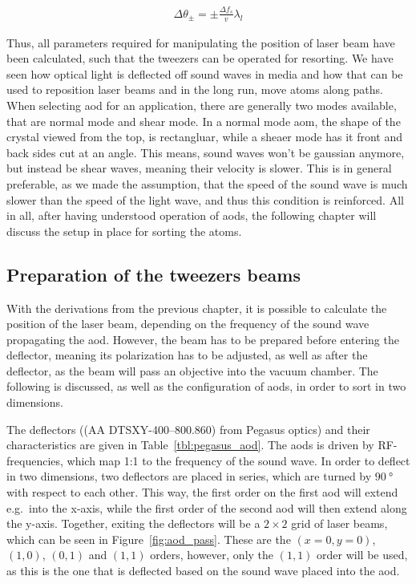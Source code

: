 \begin{align}
	\Delta\theta_\pm = \pm \frac {\Delta f_s}{v} \lambda_l
\end{align}
\label{eq:aod_angle}

Thus, all parameters required for manipulating the position of laser beam have been calculated, such that the tweezers can be operated for resorting. We have seen how optical light is deflected off sound waves in media and how that can be used to reposition laser beams and in the long run, move atoms along paths. When selecting \ac{aod} for an application, there are generally two modes available, that are normal mode and shear mode. In a normal mode \ac{aom}, the shape of the crystal viewed from the top, is rectangluar, while a sheaer mode has it front and back sides cut at an angle. This means, sound waves won't be gaussian anymore, but instead be shear waves, meaning their velocity is slower. This is in general preferable, as we made the assumption, that the speed of the sound wave is much slower than the speed of the light wave, and thus this condition is reinforced. All in all, after having understood operation of \acp{aod}, the following chapter will discuss the setup in place for sorting the atoms.

\subsection{Preparation of the tweezers beams}%
\label{sec:tweezer_beams}

With the derivations from the previous chapter, it is possible to calculate the position of the laser beam, depending on the frequency of the sound wave propagating the \ac{aod}. However, the beam has to be prepared before entering the deflector, meaning its polarization has to be adjusted, as well as after the deflector, as the beam will pass an objective into the vacuum chamber. The following is discussed, as well as the configuration of \acp{aod}, in order to sort in two dimensions.

The deflectors ((AA DTSXY-400--800.860) from Pegasus optics) and their characteristics are given in Table~\ref{tbl:pegasus_aod}. The \acp{aod} is driven by RF-frequencies, which map 1:1 to the frequency of the sound wave.  In order to deflect in two dimensions, two deflectors are placed in series, which are turned by $\SI{90}{\degree}$ with respect to each other. This way, the first order on the first \ac{aod} will extend e.g.\ into the x-axis, while the first order of the second \ac{aod} will then extend along the y-axis. Together, exiting the deflectors will be a $2\times2$ grid of laser beams, which can be seen in Figure~\ref{fig:aod_pass}. These are the $(x=0, y=0)$, $(1, 0)$, $(0, 1)$ and $(1, 1)$ orders, however, only the $(1,1)$ order will be used, as this is the one that is deflected based on the sound wave placed into the \ac{aod}.

